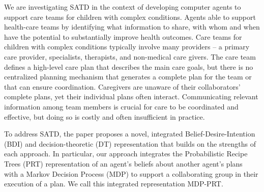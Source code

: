 

We are investigating SATD in the context of developing computer agents to support care teams for children with complex conditions.  Agents able to support health-care teams by identifying what information to share, with whom and when have the potential to substantially improve health outcomes. Care teams for children with complex conditions typically involve many providers -- a primary care provider, specialists, therapists, and non-medical care givers. The care team defines a high-level care plan that describes the main care goals, but there is no centralized planning mechanism that generates a complete plan for the team or that can ensure coordination. Caregivers are unaware of their collaborators' complete plans, yet their individual plans often interact. Communicating relevant information among team members is crucial for care to be coordinated and effective, but doing so is costly and often insufficient in practice.

To address SATD, the paper proposes a novel, integrated Belief-Desire-Intention (BDI) and decision-theoretic (DT) representation that
builds on the strengths of each approach.  
In particular, our approach integrates the Probabilistic Recipe Trees (PRT) representation of an agent's beliefs about another agent's plans~\cite{kamar2009incorporating} with a Markov Decision Process (MDP) to support a collaborating group in their execution of a plan. We call this integrated representation  MDP-PRT. 



